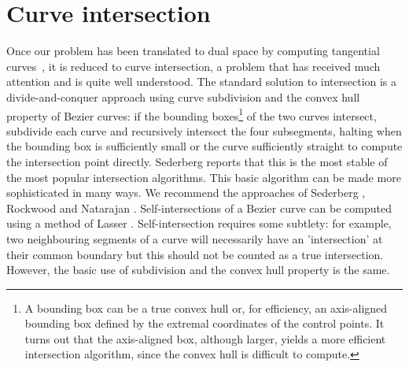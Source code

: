 \documentclass[11pt]{article}
\newcommand{\tangs}{tangential curves\ }
\begin{document}
\clearpage

\section{Curve intersection}
\label{sec:intersect}

Once our problem has been translated to dual space by computing \tangs, 
it is reduced to curve intersection, 
a problem that has received much attention and is quite well understood.
The standard solution to intersection is a divide-and-conquer approach using
curve subdivision and the convex hull property of Bezier curves:
if the bounding boxes\footnote{A bounding box can be a true convex hull
	or, for efficiency, an axis-aligned bounding box defined by the
	extremal coordinates of the control points.
	It turns out that the axis-aligned box, although larger, yields a more
	efficient intersection algorithm,
	since the convex hull is difficult to compute.}
of the two curves intersect, subdivide each curve
and recursively intersect the four subsegments,
halting when the bounding box is sufficiently small or the curve sufficiently
straight to compute the intersection point directly.
Sederberg reports that this is the most stable of the most popular
intersection algorithms.
This basic algorithm can be made more sophisticated in many ways.
We recommend the approaches of 
Sederberg \cite{sederberg86,sederberg89,sederberg90},
Rockwood \cite{rockwood90} and Natarajan \cite{nat90}.
Self-intersections of a Bezier curve can be computed using
a method of Lasser \cite{lasser89}.
Self-intersection requires some subtlety: for example, two neighbouring
segments of a curve will necessarily have an 'intersection' at their
common boundary but this should not be counted as a true intersection.
However, the basic use of subdivision and the convex hull property is the same.

\end{document}
